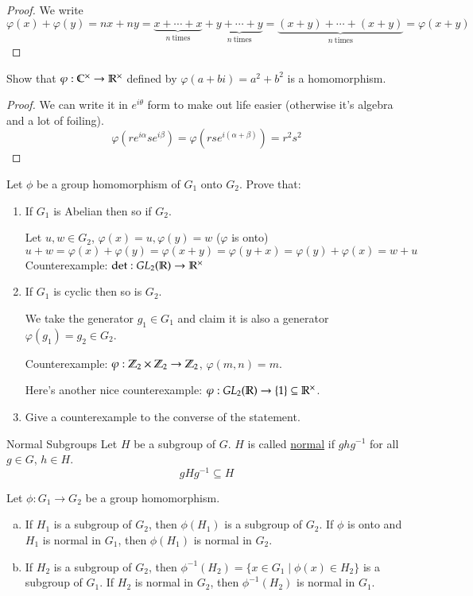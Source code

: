 \begin{proof}
	We write
	\[\varphi(x)+\varphi(y) = nx + ny = \underbrace{x + \cdots + x}_{n\ \text{times}} + \underbrace{y + \cdots + y}_{n\ \text{times}} = \underbrace{(x+y) + \cdots + (x+y)}_{n\ \text{times}}=\varphi(x + y)\]
\end{proof}

\exercise Show that $\varphi:\mathbb{C}^\times \to \mathbb{R}^\times$ defined by $\varphi(a+bi) = a^2+b^2$ is a homomorphism. 

\begin{proof}
We can write it in $e^{i\theta}$ form to make out life easier (otherwise it's algebra and a lot of foiling). 
\[\varphi(re^{i\alpha}se^{i\beta}) = \varphi(rs e^{i(\alpha+\beta)})=r^2s^2\]	
\end{proof}

\exercise Let $\phi$ be a group homomorphism of $G_1$ onto $G_2$. Prove that: 

\begin{enumerate}
	\item If $G_1$ is Abelian then so if $G_2$. 
	
	Let $u,w\in G_2$, $\varphi(x)=u, \varphi(y)=w$ ($\varphi$ is onto)
	\[u+w = \varphi(x) + \varphi(y) = \varphi(x+y) = \varphi(y+x) = \varphi(y) + \varphi(x) =  w + u\]
	Counterexample: $\det : GL_2(\mathbb{R}) \to \mathbb{R}^\times$
	\item If $G_1$ is cyclic then so is $G_2$. 
	
	We take the generator $g_1\in G_1$ and claim it is also a generator $\varphi(g_1) = g_2\in G_2$. 
	
	Counterexample: $\varphi: \mathbb{Z}_2\times \mathbb{Z}_2\to \mathbb{Z}_2$, $\varphi(m,n) = m$. 
	
	Here's another nice counterexample: $\varphi: GL_2(\mathbb{R})\to \{1\}\subseteq \mathbb{R}^\times$. 
	\item Give a counterexample to the converse of the statement. 
\end{enumerate}

\begin{defn}{Normal Subgroups}
Let $H$ be a subgroup of $G$. $H$ is called \ul{normal} if $ghg^{-1}$ for all $g\in G$, $h\in H$. 
\begin{equation}
gHg^{-1}\subseteq H	
\end{equation}
\end{defn}

\begin{proposition}
	Let $\phi:G_1\to G_2$ be a group homomorphism. 
	\begin{enumerate}[(a)]
		\item If $H_1$ is a subgroup of $G_2$, then $\phi(H_1)$ is a subgroup of $G_2$. If $\phi$ is onto and $H_1$ is normal in $G_1$, then $\phi(H_1)$ is normal in $G_2$. 
		\item If $H_2$ is a subgroup of $G_2$, then $\phi^{-1}(H_2)=\{x\in G_1\mid \phi(x)\in H_2\}$ is a subgroup of $G_1$. If $H_2$ is normal in $G_2$, then $\phi^{-1}(H_2)$ is normal in $G_1$. 
	\end{enumerate}
\end{proposition}

